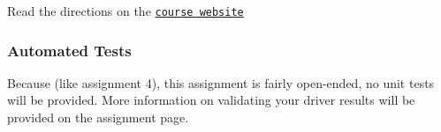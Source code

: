 Read the directions on the \href{https://jberm6.git-pages.mst.edu/essman/homework/hw6/}{\tt course website}

\subsubsection*{Automated Tests}

Because (like assignment 4), this assignment is fairly open-\/ended, no unit tests will be provided. More information on validating your driver results will be provided on the assignment page. 